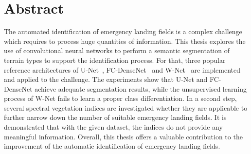 \section*{Abstract}
The automated identification of emergency landing fields is a complex challenge which requires to process huge quantities of information. This thesis explores the use of convolutional neural networks to perform a semantic segmentation of terrain types to support the identification process. For that, three popular reference architectures of U-Net~\cite{unet15}, FC-DenseNet~\cite{denseseg17} and W-Net~\cite{wnet17} are implemented and applied to the challenge. The experiments show that U-Net and FC-DenseNet achieve adequate segmentation results, while the unsupervised learning process of W-Net fails to learn a proper class differentiation. In a second step, several spectral vegetation indices are investigated whether they are applicable to further narrow down the number of suitable emergency landing fields. It is demonstrated that with the given dataset, the indices do not provide any meaningful information. Overall, this thesis offers a valuable contribution to the improvement of the automatic identification of emergency landing fields.